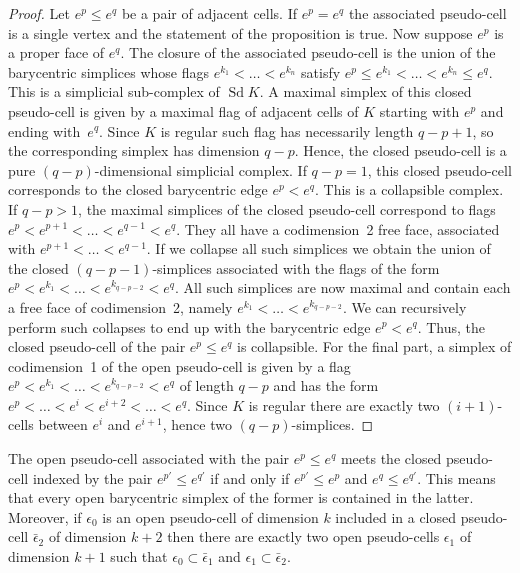 \documentclass[AHL,Unicode,longabstracts,published]{cedram}
\DeclareMathOperator{\Sd}{Sd}
\begin{document}
\begin{proof}
Let $e^p\leq e^q$ be a pair of adjacent cells. If $e^p=e^q$ the associated pseudo-cell is a single vertex and the statement of the proposition is true. Now suppose $e^p$ is a proper face of $e^q$. The closure of the associated pseudo-cell is the union of the barycentric simplices whose flags $e^{k_1}<\dots<e^{k_n}$ satisfy $e^p\leq e^{k_1}<\dots<e^{k_n}\leq e^q $. This is a simplicial sub-complex of $\Sd K$. A maximal simplex of this closed pseudo-cell is given by a maximal flag of adjacent cells of $K$ starting with $e^p$ and ending with~$e^q$. Since $K$ is regular such flag has necessarily length $q-p+1$, so the corresponding simplex has dimension $q-p$. Hence, the closed pseudo-cell is a pure $(q-p)$-dimensional simplicial complex. If $q-p=1$, this closed pseudo-cell corresponds to the closed barycentric edge $e^p<e^q$. This is a collapsible complex. If $q-p>1$, the maximal simplices of the closed pseudo-cell correspond to flags $e^p<e^{p+1}<\dots<e^{q-1}<e^q$. They all have a codimension~2 free face, associated with $e^{p+1}<\dots<e^{q-1}$. If we collapse all such simplices we obtain the union of the closed $(q-p-1)$-simplices associated with the flags of the form $e^p<e^{k_1}<\dots<e^{k_{q-p-2}}<e^q$. All such simplices are now maximal and contain each a free face of codimension~2, namely $e^{k_1}<\dots<e^{k_{q-p-2}}$. We can recursively perform such collapses to end up with the barycentric edge $e^p<e^q$. Thus, the closed pseudo-cell of the pair $e^p\leq e^q$ is collapsible. For the final part, a simplex of codimension~1 of the open pseudo-cell is given by a flag $e^p<e^{k_1}<\dots<e^{k_{q-p-2}}<e^q$ of length $q-p$ and has the form $e^p<\dots<e^i<e^{i+2}<\dots<e^q$. Since $K$ is regular there are exactly two $(i+1)$-cells between $e^i$ and $e^{i+1}$, hence two $(q-p)$-simplices.
\end{proof}

\begin{prop}
The open pseudo-cell associated with the pair $e^p\leq e^q$ meets the closed pseudo-cell indexed by the pair $e^{p'}\leq e^{q'}$ if and only if $e^{p'}\leq e^{p}$ and $e^q\leq e^{q'}$. This means that every open barycentric simplex of the former is contained in the latter. Moreover, if $\epsilon_0$ is an open pseudo-cell of dimension $k$ included in a closed pseudo-cell $\bar{\epsilon}_2$ of dimension $k+2$ then there are exactly two open pseudo-cells $\epsilon_1$ of dimension $k+1$ such that $\epsilon_0\subset\bar{\epsilon}_1$ and $\epsilon_1\subset\bar{\epsilon}_2$.
\end{prop}
\end{document}
